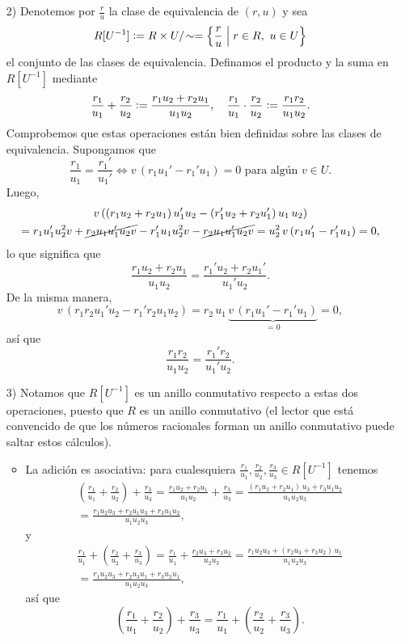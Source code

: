 \begin{construccion}
\begin{enumerate}
  \item[2)] Denotemos por $\frac{r}{u}$ la clase de equivalencia de $(r,u)$ y
    sea
    \[ R [U^{-1}] \mathrel{\mathop:}= R\times U/\!\sim =
       \Bigl\{ \frac{r}{u} \Bigm| r\in R, ~ u\in U  \Bigr\} \]
    el conjunto de las clases de equivalencia. Definamos el producto y la suma
    en $R [U^{-1}]$ mediante
    \[ \frac{r_1}{u_1} + \frac{r_2}{u_2} \mathrel{\mathop:}= \frac{r_1 u_2 + r_2 u_1}{u_1 u_2},
       \quad
       \frac{r_1}{u_1}\cdot\frac{r_2}{u_2} \mathrel{\mathop:}= \frac{r_1 r_2}{u_1 u_2}. \]
    Comprobemos que estas operaciones están bien definidas sobre las clases
    de equivalencia. Supongamos que
    \[ \frac{r_1}{u_1} = \frac{r_1'}{u_1'} \iff
       v\,(r_1 u_1' - r_1' u_1) = 0 \text{ para algún }v\in U. \]
    Luego,
    \begin{multline*}
      v\,((r_1 u_2 + r_2 u_1) \,u_1'u_2 - (r_1' u_2 + r_2 u_1')\,u_1\,u_2) \\
      = r_1u_1'u_2^2v + \cancel{r_2 u_1 u_1' u_2 v} - r_1'u_1 u_2^2 v -
        \cancel{r_2 u_1 u_1' u_2 v} = u_2^2\,v\,(r_1u_1' - r_1'u_1) = 0,
    \end{multline*}
    lo que significa que
    $$\frac{r_1 u_2 + r_2 u_1}{u_1 u_2} = \frac{r_1' u_2 + r_2 u_1'}{u_1' u_2}.$$
    De la misma manera,
    \[ v\,(r_1 r_2 u_1' u_2 - r_1' r_2 u_1 u_2) =
       r_2\,u_1\,\underbrace{v\,(r_1 u_1' - r_1' u_1)}_{= 0} = 0, \]
    así que
    $$\frac{r_1 r_2}{u_1 u_2} = \frac{r_1' r_2}{u_1' u_2}.$$

  \item[3)] Notamos que $R [U^{-1}]$ es un anillo conmutativo respecto a estas
    dos operaciones, puesto que $R$ es un anillo conmutativo (el lector que está
    convencido de que los números racionales forman un anillo conmutativo puede
    saltar estos cálculos).

    \begin{itemize}
    \item La adición es asociativa: para cualesquiera
      $\frac{r_1}{u_1}, \frac{r_2}{u_2}, \frac{r_3}{u_3}\in R [U^{-1}]$ tenemos
      \begin{multline*}
        \left(\frac{r_1}{u_1}+\frac{r_2}{u_2}\right)+\frac{r_3}{u_3} =
        \frac{r_1u_2 + r_2u_1}{u_1u_2} + \frac{r_3}{u_3} =
        \frac{(r_1u_2 + r_2 u_1)\,u_3 + r_3 u_1 u_2}{u_1 u_2 u_3} \\
        = \frac{r_1 u_2 u_3 + r_2 u_1 u_3 + r_3 u_1 u_2}{u_1 u_2 u_3},
      \end{multline*}
      y
      \begin{multline*}
        \frac{r_1}{u_1} + \left(\frac{r_2}{u_2} + \frac{r_3}{u_3}\right) =
        \frac{r_1}{u_1} + \frac{r_2 u_3 + r_3 u_2}{u_2 u_3} =
        \frac{r_1 u_2 u_3 + (r_2 u_3 + r_3 u_2)\,u_1}{u_1 u_2 u_3} \\
        = \frac{r_1 u_2 u_3 + r_2 u_3 u_1 + r_3 u_2 u_1}{u_1 u_2 u_3},
      \end{multline*}
      así que
      \[ \left(\frac{r_1}{u_1}+\frac{r_2}{u_2}\right)+\frac{r_3}{u_3} =
         \frac{r_1}{u_1} + \left(\frac{r_2}{u_2} + \frac{r_3}{u_3}\right). \]


\end{itemize}
\end{enumerate}
\end{construccion}
